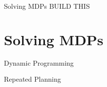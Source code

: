 \documentclass[lecture]{beamer}
\newcommand{\vect}[1]{\ensuremath{\boldsymbol{\mathrm{#1}}}}
\begin{document}
%

\begin{frame}{\normalsize Solving MDPs}
\footnotesize
BUILD THIS 
%
%
%
\end{frame}
%
%
%
%
%
%
%
%


\section{Solving MDPs}

\begin{frame}{\normalsize Dynamic Programming}
\footnotesize

\end{frame}

\begin{frame}{\normalsize Repeated Planning}
\footnotesize

\end{frame}
\end{document}
